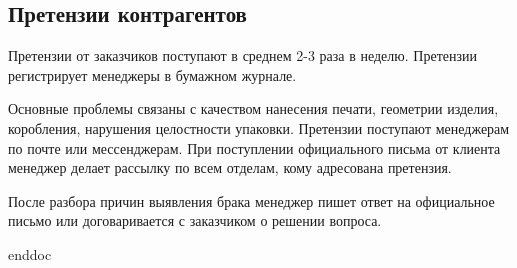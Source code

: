 \subsection{Претензии контрагентов}
\label{BP_CLaim} 

Претензии от заказчиков поступают в среднем 2-3 раза в неделю. 
Претензии регистрирует менеджеры в бумажном журнале.

Основные проблемы связаны с качеством нанесения печати, геометрии изделия, коробления, нарушения целостности упаковки.
Претензии поступают менеджерам по почте или мессенджерам. 
При поступлении официального письма от клиента менеджер делает рассылку по всем отделам, кому адресована претензия. 


После разбора причин выявления брака менеджер пишет ответ на официальное письмо или договаривается с заказчиком о решении вопроса.






\clearpage
 {enddoc}